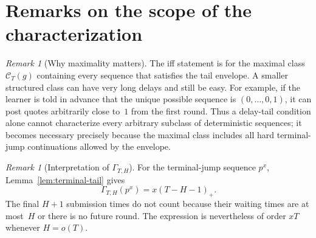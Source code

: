 \documentclass[11pt]{article}
\theoremstyle{remark}
\newtheorem{remark}[theorem]{Remark}
\newcommand{\C}{\mathcal{C}}
\newcommand{\GammaTail}{\Gamma}
\begin{document}
\section{Remarks on the scope of the characterization}

\begin{remark}[Why maximality matters]
The iff statement is for the maximal class $\C_T(g)$ containing every sequence
that satisfies the tail envelope.  A smaller structured class can have very long
delays and still be easy.  For example, if the learner is told in advance that
the unique possible sequence is $(0,\ldots,0,1)$, it can post quotes arbitrarily
close to~$1$ from the first round.  Thus a delay-tail condition alone cannot
characterize every arbitrary subclass of deterministic sequences; it becomes
necessary precisely because the maximal class includes all hard terminal-jump
continuations allowed by the envelope.
\end{remark}

\begin{remark}[Interpretation of $\GammaTail_{T,H}$]
For the terminal-jump sequence $p^x$, Lemma~\ref{lem:terminal-tail} gives
\[
    \GammaTail_{T,H}(p^x)=x(T-H-1)_+.
\]
The final $H+1$ submission times do not count because their waiting times are at
most~$H$ or there is no future round.  The expression is nevertheless of order
$xT$ whenever $H=o(T)$.
\end{remark}
\end{document}
